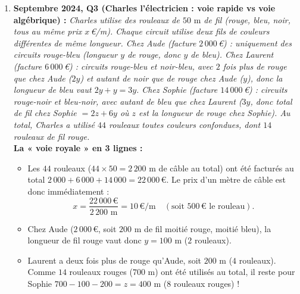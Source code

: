 \begin{exemple}
\begin{enumerate}
    \item \textbf{Septembre 2024, Q3 (Charles l'électricien : voie rapide vs voie algébrique) :}
    \emph{Charles utilise des rouleaux de $50\text{ m}$ de fil (rouge, bleu, noir, tous au même prix $x$\,€/m). Chaque circuit utilise deux fils de couleurs différentes de même longueur.
    Chez Aude (facture $2\,000$\,€) : uniquement des circuits rouge-bleu (longueur $y$ de rouge, donc $y$ de bleu).
    Chez Laurent (facture $6\,000$\,€) : circuits rouge-bleu et noir-bleu, avec $2$ fois plus de rouge que chez Aude ($2y$) et autant de noir que de rouge chez Aude ($y$), donc la longueur de bleu vaut $2y + y = 3y$.
    Chez Sophie (facture $14\,000$\,€) : circuits rouge-noir et bleu-noir, avec autant de bleu que chez Laurent ($3y$, donc total de fil chez Sophie $= 2z + 6y$ où $z$ est la longueur de rouge chez Sophie).
    Au total, Charles a utilisé $44$ rouleaux toutes couleurs confondues, dont $14$ rouleaux de fil rouge.}\\
    \textbf{La « voie royale » en 3 lignes :}
    \begin{itemize}
        \item Les $44$ rouleaux ($44 \times 50 = 2\,200\text{ m}$ de câble au total) ont été facturés au total $2\,000 + 6\,000 + 14\,000 = 22\,000$\,€. Le prix d'un mètre de câble est donc immédiatement :
        \[
            x = \frac{22\,000\,\text{€}}{2\,200\text{ m}} = \boxed{10\,\text{€/m}} \quad (\text{soit } 500\,\text{€ le rouleau}).
        \]
        \item Chez Aude ($2\,000$\,€, soit $200\text{ m}$ de fil moitié rouge, moitié bleu), la longueur de fil rouge vaut donc $\boxed{y = 100\text{ m}}$ ($2$ rouleaux).
        \item Laurent a deux fois plus de rouge qu'Aude, soit $200\text{ m}$ ($4$ rouleaux). Comme $14$ rouleaux rouges ($700\text{ m}$) ont été utilisés au total, il reste pour Sophie $700 - 100 - 200 = \boxed{z = 400\text{ m}}$ ($8$ rouleaux rouges) !
    \end{itemize}


\end{enumerate}
\end{exemple}
